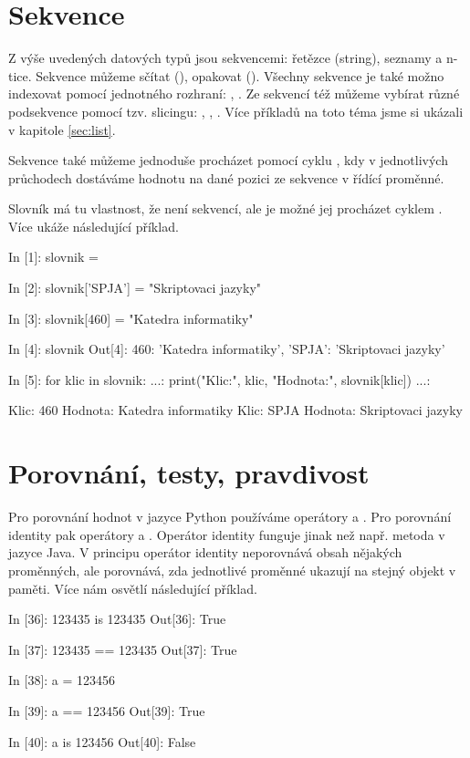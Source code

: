 \section{Sekvence} \label{sec:sequnces}

Z výše uvedených datových typů jsou sekvencemi: řetězce (string), seznamy a n-tice.
Sekvence můžeme sčítat (), opakovat (). Vše\-chny sekvence je také možno indexovat
pomocí jednotného rozhraní: , . Ze sekvencí též můžeme vybírat různé podsekvence pomocí tzv.
slicingu: , , . Více příkladů na toto téma jsme si ukázali v kapitole
\ref{sec:list}.

Sekvence také můžeme jednoduše procházet pomocí cyklu , kdy v jednotlivých průchodech dostáváme hodnotu
na dané pozici ze sekvence v řídící proměnné.

Slovník má tu vlastnost, že není sekvencí, ale je možné jej procházet cyklem . Více ukáže následující příklad.

\begin{python}
In [1]: slovnik = {}

In [2]: slovnik['SPJA'] = "Skriptovaci jazyky"

In [3]: slovnik[460] = "Katedra informatiky"

In [4]: slovnik
Out[4]: {460: 'Katedra informatiky',
         'SPJA': 'Skriptovaci jazyky'}

In [5]: for klic in slovnik:
   ...:     print("Klic:", klic, "Hodnota:", slovnik[klic])
   ...:     

Klic: 460 Hodnota: Katedra informatiky
Klic: SPJA Hodnota: Skriptovaci jazyky
\end{python}

\section{Porovnání, testy, pravdivost}

Pro porovnání hodnot v jazyce Python používáme operátory \kod{==} a \kod{!=}.
Pro porovnání identity pak operátory  a . Operátor identity funguje jinak než např. metoda 
v jazyce Java. V principu operátor identity neporovnává obsah nějakých proměnných, ale porovnává, zda jednotlivé
proměnné ukazují na stejný objekt v paměti. Více nám osvětlí následující příklad.

\begin{python}
In [36]: 123435 is 123435
Out[36]: True

In [37]: 123435 == 123435
Out[37]: True

In [38]: a = 123456

In [39]: a == 123456
Out[39]: True

In [40]: a is 123456
Out[40]: False
\end{python}

